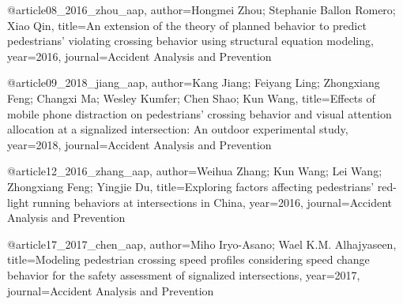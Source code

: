 @article{08_2016_zhou_aap,
  author={Hongmei Zhou; Stephanie Ballon Romero; Xiao Qin},
  title={An extension of the theory of planned behavior to predict pedestrians' violating crossing behavior using structural equation modeling},
  year={2016},
  journal={Accident Analysis and Prevention}
}

@article{09_2018_jiang_aap,
  author={Kang Jiang; Feiyang Ling; Zhongxiang Feng; Changxi Ma; Wesley Kumfer; Chen Shao; Kun Wang},
  title={Effects of mobile phone distraction on pedestrians' crossing behavior and visual attention allocation at a signalized intersection: An outdoor experimental study},
  year={2018},
  journal={Accident Analysis and Prevention}
}

@article{12_2016_zhang_aap,
  author={Weihua Zhang; Kun Wang; Lei Wang; Zhongxiang Feng; Yingjie Du},
  title={Exploring factors affecting pedestrians' red-light running behaviors at intersections in China},
  year={2016},
  journal={Accident Analysis and Prevention}
}

@article{17_2017_chen_aap,
  author={Miho Iryo-Asano; Wael K.M. Alhajyaseen},
  title={Modeling pedestrian crossing speed profiles considering speed change behavior for the safety assessment of signalized intersections},
  year={2017},
  journal={Accident Analysis and Prevention}
}